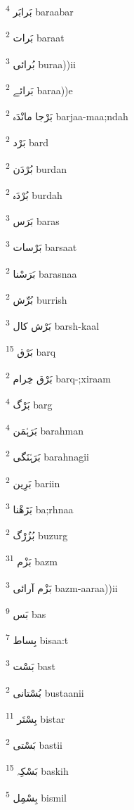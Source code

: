 \documentclass[12pt]{article}
\begin{document}
\begin{RTL}
\begin{multicols}{5}
{\ur بَرابَر}   \textsuperscript{4} baraabar

{\ur بَرات}   \textsuperscript{2} baraat

{\ur بُرائی}   \textsuperscript{3} buraa))ii

{\ur بَرائے}   \textsuperscript{2} baraa))e

{\ur بَرْجا مانْدَہ}   \textsuperscript{2} barjaa-maa;ndah

{\ur بَرْد}   \textsuperscript{2} bard

{\ur بُرْدَن}   \textsuperscript{2} burdan

{\ur بُرْدَہ}   \textsuperscript{2} burdah

{\ur بَرَس}   \textsuperscript{3} baras

{\ur بَرْسات}   \textsuperscript{3} barsaat

{\ur بَرَسْنا}   \textsuperscript{2} barasnaa

{\ur بُرِّش}   \textsuperscript{2} burrish

{\ur بَرْش کال}   \textsuperscript{3} barsh-kaal

{\ur بَرْق}   \textsuperscript{15} barq

{\ur بَرْق خِرام}   \textsuperscript{2} barq-;xiraam

{\ur بَرْگ}   \textsuperscript{4} barg

{\ur بَرَہْمَن}   \textsuperscript{4} barahman

{\ur بَرَہْنَگی}   \textsuperscript{2} barahnagii

{\ur بَرِین}   \textsuperscript{2} bariin

{\ur بَڑھْنا}   \textsuperscript{3} ba;rhnaa

{\ur بُزُرْگ}   \textsuperscript{2} buzurg

{\ur بَزْم}   \textsuperscript{31} bazm

{\ur بَزْم آرائی}   \textsuperscript{3} bazm-aaraa))ii

{\ur بَس}   \textsuperscript{9} bas

{\ur بِساط}   \textsuperscript{7} bisaa:t

{\ur بَسْت}   \textsuperscript{3} bast

{\ur بُسْتانی}   \textsuperscript{2} bustaanii

{\ur بِسْتَر}   \textsuperscript{11} bistar

{\ur بَسْتی}   \textsuperscript{2} bastii

{\ur بَسْکِہ}   \textsuperscript{15} baskih

{\ur بِسْمِل}   \textsuperscript{5} bismil


\end{multicols}
\end{RTL}
\end{document}
